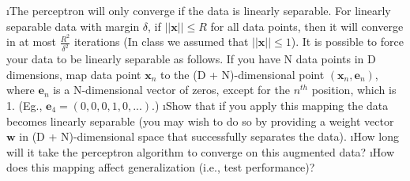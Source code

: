\documentclass[fleqn]{article}
\begin{document}



\bee
\i The perceptron will only converge if the data is linearly separable. For linearly separable data with margin $\delta$, if
$||\mathbf{x}|| \leq R$ for all data points, then it will converge in at most $\frac{R^2}{\delta^2}$
iterations (In class we assumed that $||\mathbf{x}|| \leq 1$). It is possible to force your data to be linearly separable as follows. If you have N data points in D dimensions, map data
point $\mathbf{x}_n$ to the (D + N)-dimensional point $(\mathbf{x}_n, \mathbf{e}_n)$, where $\mathbf{e}_n$ is a N-dimensional vector of zeros,
except for the $n^{th}$ position, which is 1. (Eg., $\mathbf{e}_4 = (0, 0, 0, 1, 0, . . .)$.)
\bee
\i Show that if you apply this mapping the data becomes linearly separable (you may wish to do
so by providing a weight vector $\mathbf{w}$ in (D + N)-dimensional space that successfully separates the
data).
\i How long will it take the perceptron algorithm to converge on this augmented data?
\i How does this mapping affect generalization (i.e., test performance)?
\ene
\end{document}

